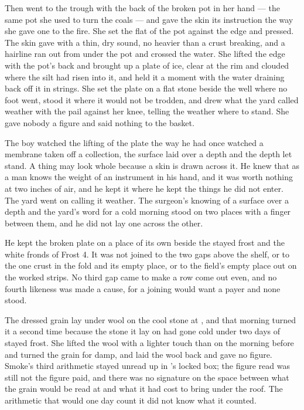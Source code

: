 Then  went to the trough with the back of the broken pot in her hand --- the same pot she used to turn the coals --- and gave the skin its instruction the way she gave one to the fire. She set the flat of the pot against the edge and pressed. The skin gave with a thin, dry sound, no heavier than a crust breaking, and a hairline ran out from under the pot and crossed the water. She lifted the edge with the pot's back and brought up a plate of ice, clear at the rim and clouded where the silt had risen into it, and held it a moment with the water draining back off it in strings. She set the plate on a flat stone beside the well where no foot went, stood it where it would not be trodden, and drew what the yard called weather with the pail against her knee, telling the weather where to stand. She gave nobody a figure and said nothing to the basket.

The boy watched the lifting of the plate the way he had once watched a membrane taken off a collection, the surface laid over a depth and the depth let stand. A thing may look whole because a skin is drawn across it. He knew that as a man knows the weight of an instrument in his hand, and it was worth nothing at two inches of air, and he kept it where he kept the things he did not enter. The yard went on calling it weather. The surgeon's knowing of a surface over a depth and the yard's word for a cold morning stood on two places with a finger between them, and he did not lay one across the other.

He kept the broken plate on a place of its own beside the stayed frost and the white fronds of Frost 4. It was not joined to the two gaps above the shelf, or to the one crust in the fold and its empty place, or to the field's empty place out on the worked strips. No third gap came to make a row come out even, and no fourth likeness was made a cause, for a joining would want a payer and none stood.

The dressed grain lay under wool on the cool stone at , and that morning  turned it a second time because the stone it lay on had gone cold under two days of stayed frost. She lifted the wool with a lighter touch than on the morning before and turned the grain for damp, and laid the wool back and gave no figure. Smoke's third arithmetic stayed unread up  in 's locked box; the figure read was still not the figure paid, and there was no signature on the space between what the grain would be read at and what it had cost to bring under the roof. The arithmetic that would one day count it did not know what it counted.

